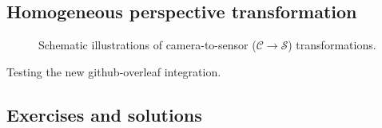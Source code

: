 \documentclass[draft]{CVCN}
\begin{document}
\subsection{Homogeneous perspective transformation}

\begin{figure}
    \centering
    
    \caption{Schematic illustrations of camera-to-sensor (\(\mathcal{C}\rightarrow\mathcal{S}\)) transformations.}%
    \label{fig:homocoords-perspectivetransform}
\end{figure}

Testing the new github-overleaf integration.


\subsection{Exercises and solutions}

\printsolutions\
\end{document}
